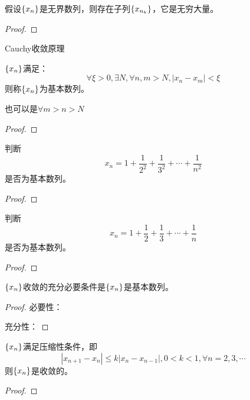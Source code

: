 \documentclass[lang=cn]{elegantbook}
\begin{document}
\begin{theorem}
    假设$\left\{ x_n\right\}$是无界数列，则存在子列$\left\{ x_{n_k}\right\}$，它是无穷大量。
\end{theorem}
\begin{proof}
    
\end{proof}

Cauchy收敛原理

\begin{definition}
    $\left\{ x_n\right\}$满足：
    \[\forall \xi > 0, \exists N, \forall n, m > N, \left|x_n - x_m\right| < \xi \]
    则称$\left\{ x_n\right\}$为基本数列。
\end{definition}
也可以是$\forall m > n > N$
\begin{proof}
\end{proof}

\begin{proposition}
    判断
    \[ x_n = 1 + \frac{1}{2^2} + \frac{1}{3^2} + \cdots + \frac{1}{n^2} \]
    是否为基本数列。
\end{proposition}
\begin{proof}

\end{proof}

\begin{proposition}
    判断
    \[ x_n = 1 + \frac{1}{2} + \frac{1}{3} + \cdots + \frac{1}{n} \]
    是否为基本数列。
\end{proposition}
\begin{proof}

\end{proof}

\begin{theorem}[Cauchy收敛原理]
    $\left\{ x_n\right\}$收敛的充分必要条件是$\left\{ x_n\right\}$是基本数列。
\end{theorem}
\begin{proof}
必要性：

充分性：
\end{proof}

\begin{proposition}
    $\left\{ x_n\right\}$满足压缩性条件，即
    \[ \left| x_{n+1} -x_n \right| \le k\left| x_n - x_{n-1}\right|, 0 < k < 1, \forall n = 2, 3, \cdots \] 
    则$\left\{ x_n\right\}$是收敛的。
\end{proposition}
\begin{proof}

\end{proof}
\end{document}
